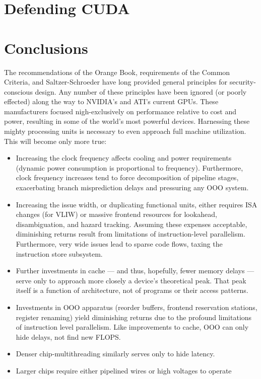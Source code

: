 \documentclass[letterpaper,10pt]{article}
\begin{document}
\begin{multicols}{2}
\section{Defending CUDA}

\section{Conclusions} 
The recommendations of the Orange Book\cite{orangebook}, requirements of the Common Criteria\cite{ccrit},
and Saltzer-Schroeder\cite{principles} have long provided general principles for
security-conscious design. Any number of these principles have been ignored
(or poorly effected) along the way to NVIDIA's and ATI's current GPUs. These
manufacturers focused nigh-exclusively on performance relative to cost and
power, resulting in some of the world's most powerful devices. Harnessing these
mighty processing units is necessary to even approach full machine utilization.
This will become only more true:
\begin{itemize}
\item Increasing the clock frequency affects cooling and power requirements
(dynamic power consumption is proportional to frequency). Furthermore,
clock frequency increases tend to force decomposition of pipeline
stages, exacerbating branch misprediction delays and pressuring any OOO
system\cite{cormean}.
\item Increasing the issue width, or duplicating functional units, either
requires ISA changes (for VLIW) or massive frontend resources for lookahead,
disambiguation, and hazard tracking. Assuming these expenses acceptable,
diminishing returns result from limitations of instruction-level parallelism.
Furthermore, very wide issues lead to sparse code flows, taxing the instruction
store subsystem. 
\item Further investments in cache --- and thus, hopefully, fewer memory
delays --- serve only to approach more closely a device's theoretical peak.
That peak itself is a function of architecture, not of programs or their
access patterns.
\item Investments in OOO apparatus (reorder buffers,
frontend reservation stations, register renaming) yield diminishing returns due
to the profound limitations of instruction level parallelism\cite{phenn}. Like improvements
to cache, OOO can only hide delays, not find new FLOPS\@.
\item Denser chip-multithreading similarly serves only to hide latency.
\item Larger chips require either pipelined wires or high voltages to operate

\end{itemize}
\end{multicols}
\end{document}
